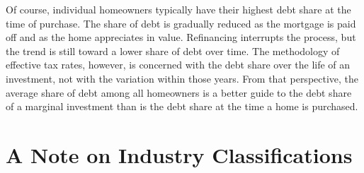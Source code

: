 \documentclass[article,11pt,letterpaper,fleqn]{article}
\theoremstyle{definition}
\numberwithin{equation}{section}
\begin{document}
Of course, individual homeowners typically have their highest debt share at the time of purchase. The share of debt is gradually reduced as the mortgage is paid off and as the home appreciates in value. Refinancing interrupts the process, but the trend is still toward a lower share of debt over time. The methodology of effective tax rates, however, is concerned with the debt share over the life of an investment, not with the variation within those years. From that perspective, the average share of debt among all homeowners is a better guide to the debt share of a marginal investment than is the debt share at the time a home is purchased.

%
%
%

%
%
%
%
%


\section{A Note on Industry Classifications}
\end{document}
